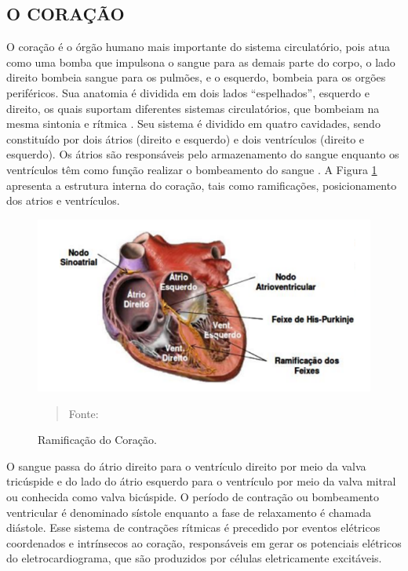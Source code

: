 \documentclass[12pt, a4paper]{article}
\begin{document}

\subsection{O CORAÇÃO}
\hspace*{0.8cm}O coração é o órgão humano mais importante do sistema circulatório, pois atua como uma bomba que impulsona o sangue para as demais parte do corpo, o lado direito bombeia sangue para os pulmões, e o esquerdo, bombeia para os orgões periféricos. Sua anatomia é dividida em dois lados “espelhados”, esquerdo e direito, os quais suportam diferentes sistemas circulatórios, que bombeiam na mesma sintonia e rítmica \cite{guyton}. Seu sistema é dividido em quatro cavidades, sendo constituído por dois átrios (direito e esquerdo) e dois ventrículos (direito e esquerdo).   Os átrios são responsáveis pelo armazenamento do sangue enquanto os ventrículos têm como função realizar o bombeamento do sangue  \cite{silva}.
A Figura \ref{fig:ramcor} apresenta a estrutura interna do coração, tais como ramificações, posicionamento dos atrios e ventrículos. 


\begin{figure}[!htb]
\begin{center}
			\caption{Ramificação do Coração.}
			\includegraphics[width=.5\textwidth]{Figuras/cor.png}
            \vspace*{\fill} 
            \begin{quote} 
            \centering 
            Fonte: \cite{ronald} 
            \end{quote}
            \vspace*{\fill}
			\label{fig:ramcor}
\end{center}
\end{figure}

O sangue passa do átrio direito para o ventrículo direito por meio da valva tricúspide e do lado do átrio esquerdo para o ventrículo por meio da valva mitral ou conhecida como valva bicúspide. O período de contração ou bombeamento ventricular é denominado sístole enquanto a fase de relaxamento é chamada diástole. Esse sistema de contrações rítmicas é precedido por eventos elétricos coordenados e intrínsecos ao coração, responsáveis em gerar os potenciais elétricos do eletrocardiograma, que são produzidos por células eletricamente excitáveis.
\end{document}
